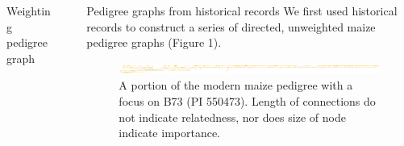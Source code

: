 \documentclass[final]{beamer}
\newlength{\sepwid}
\newlength{\onecolwid}
\begin{document}
\begin{frame}[t]
\begin{columns}[t]
\begin{column}{\onecolwid}
\begin{alertblock}{Weighting pedigree graph}
\end{alertblock}


\end{column} %

\begin{column}{\sepwid}\end{column} %

\begin{column}{\onecolwid} %

\begin{block}{Pedigree graphs from historical records}
We first used historical records to construct a series of directed, unweighted maize pedigree graphs (Figure 1).  
\begin{figure}
\includegraphics[width=1.0\linewidth]{pedigree_poster.pdf}
\caption{A portion of the modern maize pedigree with a focus on B73 (PI 550473). Length of connections do not indicate relatedness, nor does size of node indicate importance.} 
\end{figure}

\end{block}



\end{column}
\end{columns}
\end{frame}
\end{document}

